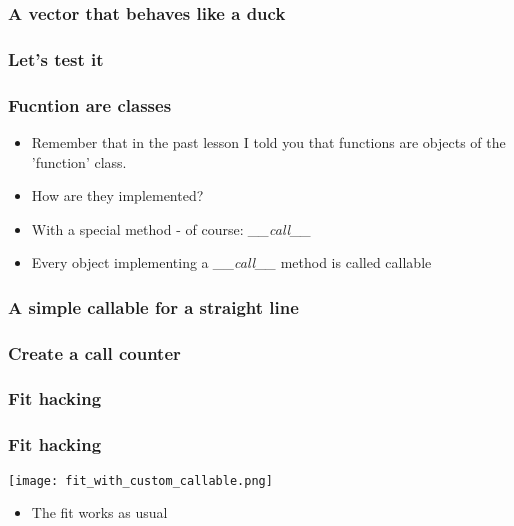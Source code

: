 \documentclass[9pt]{beamer}
\begin{document}
\begin{frame}
  \frametitle{A vector that behaves like a duck}
  
\end{frame}


\begin{frame}
  \frametitle{Let's test it}
  
\end{frame}


\begin{frame}
  \frametitle{Fucntion are classes}
  
  \begin{itemize}
    \item Remember that in the past lesson I told you that functions are objects
          of the 'function' class.
    \medskip
    \item How are they implemented?
    \medskip
    \item With a special method - of course: \emph{\_\_call\_\_}
    \medskip
    \item Every object implementing a \emph{\_\_call\_\_} method is called \alert{callable}
  \end{itemize}
  
\end{frame}


\begin{frame}
  \frametitle{A simple callable for a straight line}
  
\end{frame}


\begin{frame}
  \frametitle{Create a call counter}
  
\end{frame}


\begin{frame}
  \frametitle{Fit hacking}
  
\end{frame}


\begin{frame}
  \frametitle{Fit hacking}
  \centering
  \texttt{[image: fit\_with\_custom\_callable.png]}
  
  \medskip
  
  \begin{itemize}
    \item The fit works as usual
   \end{itemize}  
\end{frame}
\end{document}
